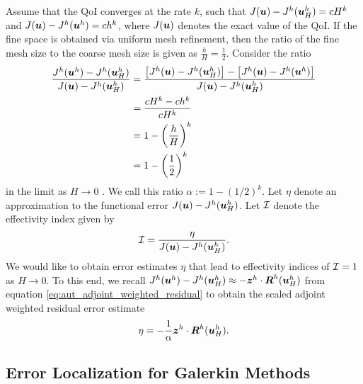 Assume that the QoI converges at the rate $k$, such that
$J(\boldsymbol{u}) - J^h(\boldsymbol{u}^h_H) = c H^k$ and $J(\boldsymbol{u}) - J^h(\boldsymbol{u}^h) = ch^k$,
where $J(\boldsymbol{u})$ denotes the exact value of the QoI. If the fine space
is obtained via uniform mesh refinement, then the ratio of the fine mesh size
to the coarse mesh size is given as $\frac{h}{H} = \frac12$. Consider the ratio
%
\begin{gather}
\begin{aligned}
\frac{ J^h (\boldsymbol{u}^h) - J^h(\boldsymbol{u}^h_H) }{ J(\boldsymbol{u}) - J^h(\boldsymbol{u}^h_H) }
&= \frac{\left[ J^h(\boldsymbol{u}) - J^h(\boldsymbol{u}^h_H) \right] -
\left[ J^h(\boldsymbol{u}) - J^h(\boldsymbol{u}^h) \right] }
{ J(\boldsymbol{u}) - J^h(\boldsymbol{u}^h_H) } \\
&= \frac{c H^k - ch^k}{c H^k} \\
&= 1 - \left( \frac{h}{H} \right)^k \\
&= 1 - \left( \frac12 \right)^k
\end{aligned}
\end{gather}
%
in the limit as $H \to 0$ \cite{fidkowski2011review}. We call this
ratio $\alpha := 1 - (1/2)^k$. Let $\eta$ denote an approximation
to the functional error $J(\boldsymbol{u}) - J^h(\boldsymbol{u}^h_H)$. Let $\mathcal{I}$
denote the effectivity index given by
%
\begin{gather}
\mathcal{I} = \frac{\eta}{ J(\boldsymbol{u}) - J^h(\boldsymbol{u}^h_H) }.
\label{eq:aut_effectivity}
\end{gather}
%
We would like to obtain error estimates $\eta$ that lead to
effectivity indices of $\mathcal{I} = 1$ as $H \to 0$. To this end, we recall
$J^h(\boldsymbol{u}^h) - J^h(\boldsymbol{u}^h_H) \approx - \boldsymbol{z}^h \cdot
\boldsymbol{R}^h(\boldsymbol{u}^h_H)$ from equation \eqref{eq:aut_adjoint_weighted_residual}
to obtain the scaled adjoint weighted residual error estimate
%
\begin{gather}
\eta = - \frac{1}{\alpha} \boldsymbol{z}^h \cdot \boldsymbol{R}^h(\boldsymbol{u}^h_H).
\label{eq:aut_error_estimate}
\end{gather}

\subsection{Error Localization for Galerkin Methods}

